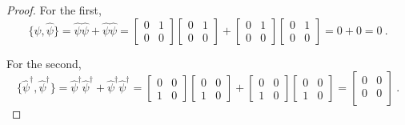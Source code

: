     \begin{proof}
        For the first, 
        \begin{equation*}
            \{\hat \psi, \hat \psi\} = \hat \psi \hat \psi + \hat \psi \hat \psi = \begin{bmatrix} 0 & 1 \\ 0 & 0 \end{bmatrix} \begin{bmatrix} 0 & 1 \\ 0 & 0 \end{bmatrix} + \begin{bmatrix} 0 & 1 \\ 0 & 0 \end{bmatrix} \begin{bmatrix} 0 & 1 \\ 0 & 0 \end{bmatrix} = 0 + 0 = 0 ~.
        \end{equation*}

        For the second, 
        \begin{equation*}
            \{\hat \psi^\dagger, \hat \psi^\dagger \} = \hat \psi^\dagger \hat \psi^\dagger + \hat \psi^\dagger \hat \psi^\dagger = \begin{bmatrix} 0 & 0 \\ 1 & 0 \end{bmatrix} \begin{bmatrix} 0 & 0 \\ 1 & 0 \end{bmatrix} + \begin{bmatrix} 0 & 0 \\ 1 & 0\end{bmatrix} \begin{bmatrix} 0 & 0 \\ 1 & 0 \end{bmatrix} = \begin{bmatrix}
                0 & 0 \\ 0 & 0 \\
            \end{bmatrix} ~.
        \end{equation*}


\end{proof}
